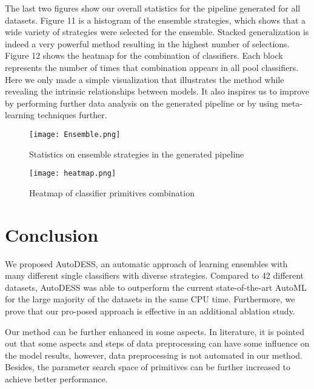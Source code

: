 \documentclass[review]{elsarticle}
\begin{document}
The last two figures show our overall statistics for the pipeline generated for all datasets. Figure 11 is a histogram of the ensemble strategies, which shows that a wide variety of strategies were selected for the ensemble. Stacked generalization is indeed a very powerful method resulting in the highest number of selections. Figure 12 shows the heatmap for the combination of classifiers. Each block represents the number of times that combination appears in all pool classifiers. Here we only made a simple visualization that illustrates the method while revealing the intrinsic relationships between models. It also inspires us to improve by performing further data analysis on the generated pipeline or by using meta-learning techniques further.
\begin{figure}[htbp]
	\centering
	\texttt{[image: Ensemble.png]}
	\caption{Statistics on ensemble strategies in the generated pipeline}
\end{figure}
\begin{figure}[htbp]
	\centering
	\texttt{[image: heatmap.png]}
	\caption{Heatmap of classifier primitives combination}
\end{figure}
\section{Conclusion}
We proposed AutoDESS, an automatic approach of learning ensembles with many different single classifiers with diverse strategies. Compared to 42 different datasets, AutoDESS was able to outperform the current state-of-the-art AutoML for the large majority of the datasets in the same CPU time. Furthermore, we prove that our pro-posed approach is effective in an additional ablation study. 

Our method can be further enhanced in some aspects. In literature\cite{DBLP:conf/icde/LiRBZCZ21}, it is pointed out that some aspects and steps of data preprocessing can have some influence on the model results, however, data preprocessing is not automated in our method. Besides, the parameter search space of primitives can be further increased to achieve better performance.

\end{document}

